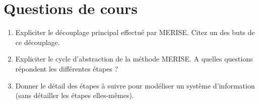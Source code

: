 \section*{Questions de cours}

\begin{enumerate}
	\item Expliciter le découplage principal effectué par MERISE. Citez un des buts de ce découplage.
	\item Expliciter le cycle d'abstraction de la méthode MERISE. A quelles questions répondent les différentes étapes ?
	\item Donner le détail des étapes à suivre pour modéliser un système d'information (sans détailler les étapes elles-mêmes).
\end{enumerate}